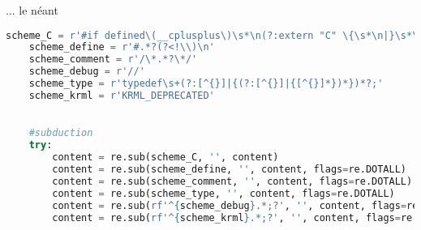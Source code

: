 \documentclass[A4,svgnames,9pt,aspectratio=169]{beamer}
\begin{document}

\begin{frame}[fragile]{... le néant}

  \begin{lstlisting}[style=global, language=Python, caption={get\_data.py}, gobble=4]
    scheme_C = r'#if defined\(__cplusplus\)\s*\n(?:extern "C" \{\s*\n|}\s*\n)#endif\s*\n'
    scheme_define = r'#.*?(?<!\\)\n'
    scheme_comment = r'/\*.*?\*/'
    scheme_debug = r'//'
    scheme_type = r'typedef\s+(?:[^{}]|{(?:[^{}]|{[^{}]*})*})*?;'
    scheme_krml = r'KRML_DEPRECATED'
    

    #subduction
    try:
        content = re.sub(scheme_C, '', content)
        content = re.sub(scheme_define, '', content, flags=re.DOTALL)
        content = re.sub(scheme_comment, '', content, flags=re.DOTALL)
        content = re.sub(scheme_type, '', content, flags=re.DOTALL)
        content = re.sub(rf'^{scheme_debug}.*;?', '', content, flags=re.MULTILINE)
        content = re.sub(rf'^{scheme_krml}.*;?', '', content, flags=re.MULTILINE)
  \end{lstlisting}

\end{frame}

\end{document}
